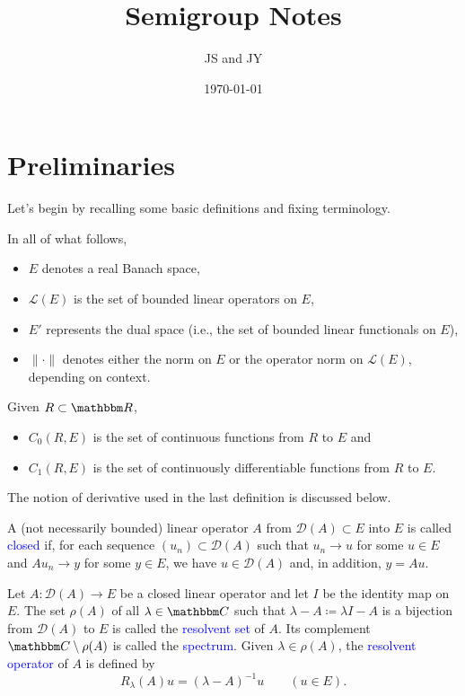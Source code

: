 \documentclass[12pt, reqno]{amsart}
\newcommand{\1}{\mathbbm 1}
\newcommand{\lL}{\mathcal L}
\newcommand{\dD}{\mathcal D}
\newcommand{\RR}{\mathbbm R}
\newcommand{\CC}{\mathbbm C}
\theoremstyle{plain}
\theoremstyle{definition}
\newcommand{\navy}[1]{\textcolor{blue}{#1}}
\begin{document}
\title{Semigroup Notes}

\author{JS and JY}

\date{\today}

\maketitle

\section{Preliminaries}

Let's begin by recalling some basic definitions and fixing terminology.

In all of what follows, 
%
\begin{itemize}
    \item $E$ denotes a real Banach space,
    \item $\lL(E)$ is the set of bounded linear operators on $E$,
    \item $E'$ represents the dual space (i.e., the set of bounded linear
        functionals on $E$),
    \item $\| \cdot \|$ denotes either the norm on $E$ or the operator norm on
        $\lL(E)$, depending on context. 
\end{itemize}

Given $R \subset \RR$,
%
\begin{itemize}
    \item $C_0(R, E)$ is the set of continuous functions from $R$ to $E$
        and
    \item $C_1(R, E)$ is the set of continuously differentiable functions
        from $R$ to $E$.
\end{itemize}
%
The notion of derivative used in the last definition is discussed below.

A (not necessarily bounded) linear operator $A$ from $\dD(A) \subset
E$ into $E$ is called \navy{closed} if, for each sequence
$(u_n) \subset \dD(A)$ such that $u_n \to u$ for some $u \in E$ and $Au_n \to y$
for some $y \in E$, we have $u \in \dD(A)$ and, in addition, $y = Au$.

Let $A \colon \dD(A) \to E$ be a closed linear operator and let $I$ be the
identity map on $E$.  The set $\rho(A)$ of all $\lambda \in \CC$ such that
$\lambda - A \coloneq \lambda I - A$ is a bijection from $\dD(A)$ to $E$ is called the
\navy{resolvent set} of $A$.  Its complement $\CC \setminus \rho(A)$ is called
the \navy{spectrum}.  Given $\lambda \in \rho(A)$, the \navy{resolvent operator}
of $A$ is defined by
%
\begin{equation*}
    R_\lambda (A) u = (\lambda - A)^{-1} u
    \qquad (u \in E).
\end{equation*}
\end{document}
